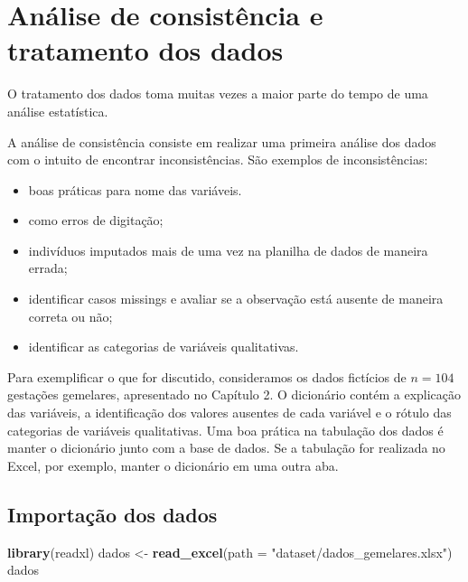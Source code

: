 \documentclass[
]{book}
\newenvironment{Shaded}{\begin{snugshade}}{\end{snugshade}}
\newcommand{\DataTypeTok}[1]{\textcolor[rgb]{0.13,0.29,0.53}{#1}}
\newcommand{\KeywordTok}[1]{\textcolor[rgb]{0.13,0.29,0.53}{\textbf{#1}}}
\newcommand{\NormalTok}[1]{#1}
\newcommand{\StringTok}[1]{\textcolor[rgb]{0.31,0.60,0.02}{#1}}
\providecommand{\tightlist}{%
  \setlength{\itemsep}{0pt}\setlength{\parskip}{0pt}}
\begin{document}
\hypertarget{consistencia}{%
\section{Análise de consistência e tratamento dos dados}\label{consistencia}}

O tratamento dos dados toma muitas vezes a maior parte do tempo de uma análise estatística.

A análise de consistência consiste em realizar uma primeira análise dos dados com o intuito de encontrar inconsistências. São exemplos de inconsistências:

\begin{itemize}
\tightlist
\item
  boas práticas para nome das variáveis.
\item
  como erros de digitação;
\item
  indivíduos imputados mais de uma vez na planilha de dados de maneira errada;
\item
  identificar casos missings e avaliar se a observação está ausente de maneira correta ou não;
\item
  identificar as categorias de variáveis qualitativas.
\end{itemize}

Para exemplificar o que for discutido, consideramos os dados fictícios de \(n=104\) gestações gemelares, apresentado no Capítulo 2. O dicionário contém a explicação das variáveis, a identificação dos valores ausentes de cada variável e o rótulo das categorias de variáveis qualitativas. Uma boa prática na tabulação dos dados é manter o dicionário junto com a base de dados. Se a tabulação for realizada no Excel, por exemplo, manter o dicionário em uma outra aba.

\hypertarget{importauxe7uxe3o-dos-dados}{%
\subsection{Importação dos dados}\label{importauxe7uxe3o-dos-dados}}

\begin{Shaded}
\begin{Highlighting}[]
\KeywordTok{library}\NormalTok{(readxl)}
\NormalTok{dados <-}\StringTok{ }\KeywordTok{read_excel}\NormalTok{(}\DataTypeTok{path =} \StringTok{"dataset/dados_gemelares.xlsx"}\NormalTok{)}
\NormalTok{dados}
\end{Highlighting}
\end{Shaded}
\end{document}
